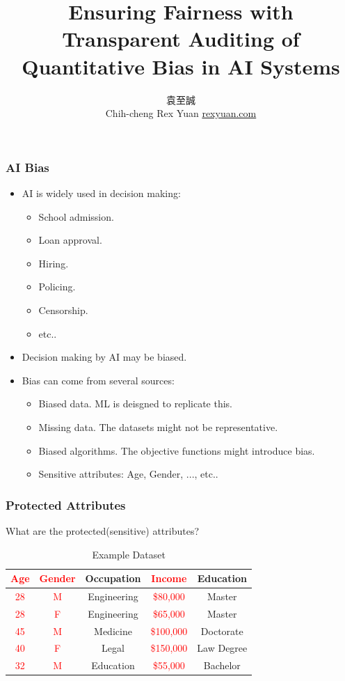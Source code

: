 \documentclass{beamer}
\date{\displaydate{date}}
\title[Fairness]{Ensuring Fairness with Transparent Auditing of
Quantitative Bias in AI Systems}
\author[Rex]{
    \begin{CJK}{UTF8}{bsmi}袁至誠\end{CJK}\newline
    Chih-cheng Rex Yuan\newline
    \href{https://rexyuan.com/}{rexyuan.com}
    }
\institute[IIS,AS]{Institute of Information Science, Academia Sinica}
\newcommand{\red}[1]{\textcolor{red}{#1}}
\begin{document}
\begin{frame}
\titlepage
\end{frame}

\begin{frame}
    \frametitle{AI Bias}
    \begin{itemize}
        \item AI is widely used in decision making:
        \begin{itemize}
            \item School admission.
            \item Loan approval.
            \item Hiring.
            \item Policing.
            \item Censorship.
            \item etc..
        \end{itemize}
        \item Decision making by AI may be biased.
        \item Bias can come from several sources:
        \begin{itemize}
            \item Biased data. ML is deisgned to replicate this.
            \item Missing data. The datasets might not be representative.
            \item Biased algorithms. The objective functions might introduce bias.
            \item Sensitive attributes: Age, Gender, ..., etc..
        \end{itemize}
    \end{itemize}
\end{frame}

\begin{frame}
    \frametitle{Protected Attributes}
    What are the protected(sensitive) attributes?
    \begin{table}
        \begin{tabular}{|c|c|c|c|c|}
            \hline
            \red{Age} & \red{Gender} & Occupation & \red{Income} & Education \\
            \hline
            \red{28} & \red{M} & Engineering & \red{\$80,000} & Master \\
            \red{28} & \red{F} & Engineering & \red{\$65,000} & Master \\
            \red{45} & \red{M} & Medicine    & \red{\$100,000} & Doctorate \\
            \red{40} & \red{F} & Legal       & \red{\$150,000} & Law Degree \\
            \red{32} & \red{M} & Education   & \red{\$55,000} & Bachelor \\
            \hline
        \end{tabular}
        \caption{Example Dataset}
    \end{table}
\end{frame}
\end{document}
